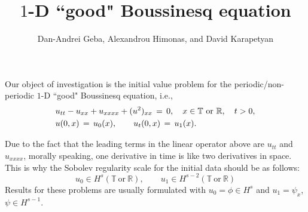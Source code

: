 \documentclass[12pt,reqno]{amsart}
\numberwithin{equation}{section}  %
\numberwithin{figure}{section}
\begin{document}
\title{$1$-D ``good" Boussinesq equation}

\author{Dan-Andrei Geba, Alexandrou Himonas, and David Karapetyan}

\address{Department of Mathematics, University of Rochester, Rochester, NY 14627}
\address{Department of Mathematics, University of Notre Dame, Notre Dame, IN 46556}
\address{Department of Mathematics, University of Notre Dame, Notre Dame, IN 46556}
\date{}



\maketitle

Our object of investigation is the initial value problem for the periodic/non-periodic $1$-D ``good" Boussinesq equation, i.e.,
\begin{equation}
  \aligned
  &u_{tt}-u_{xx}+u_{xxxx}+(u^2)_{xx}\,=\,0, \quad x\in \mathbb{T}\ \text{or} \ \mathbb{R}, \quad t>0,\\
&u(0,x)\,=\,u_0(x),\qquad u_t(0,x)\,=\,u_1(x).\endaligned
\label{main}
\end{equation}

Due to the fact that the leading terms in the linear operator above are $u_{tt}$ and $u_{xxxx}$, morally speaking, one derivative in time is like two derivatives in space. This is why the Sobolev regularity scale for the initial data should be as follows:
\[
u_0\in H^s(\mathbb{T}\ \text{or} \ \mathbb{R}), \qquad u_1\in H^{s-2}(\mathbb{T}\ \text{or} \ \mathbb{R})
\]
Results for these problems are usually formulated with $u_0=\phi \in H^s$ and $u_1=\psi_x$, $\psi\in H^{s-1}$.
\end{document}
